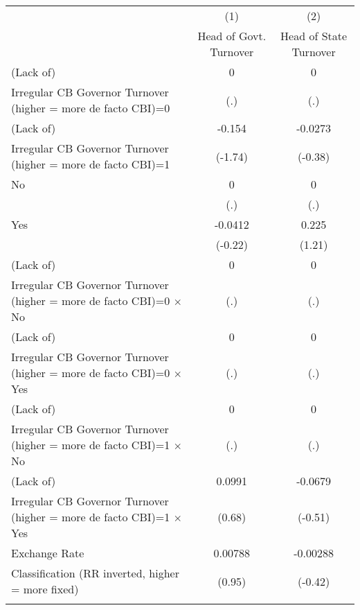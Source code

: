 {
\def\sym#1{\ifmmode^{#1}\else\(^{#1}\)\fi}
\begin{tabular}{l*{2}{c}}
\toprule
                &\multicolumn{1}{c}{(1)}&\multicolumn{1}{c}{(2)}\\
                &\multicolumn{1}{c}{Head of Govt. Turnover}&\multicolumn{1}{c}{Head of State Turnover}\\
\midrule
(Lack of)       &        0         &        0         \\
Irregular CB Governor Turnover (higher = more de facto CBI)=0&      (.)         &      (.)         \\
\addlinespace
(Lack of)       &   -0.154         &  -0.0273         \\
Irregular CB Governor Turnover (higher = more de facto CBI)=1&  (-1.74)         &  (-0.38)         \\
\addlinespace
No              &        0         &        0         \\
                &      (.)         &      (.)         \\
\addlinespace
Yes             &  -0.0412         &    0.225         \\
                &  (-0.22)         &   (1.21)         \\
\addlinespace
(Lack of)       &        0         &        0         \\
Irregular CB Governor Turnover (higher = more de facto CBI)=0 $\times$ No&      (.)         &      (.)         \\
\addlinespace
(Lack of)       &        0         &        0         \\
Irregular CB Governor Turnover (higher = more de facto CBI)=0 $\times$ Yes&      (.)         &      (.)         \\
\addlinespace
(Lack of)       &        0         &        0         \\
Irregular CB Governor Turnover (higher = more de facto CBI)=1 $\times$ No&      (.)         &      (.)         \\
\addlinespace
(Lack of)       &   0.0991         &  -0.0679         \\
Irregular CB Governor Turnover (higher = more de facto CBI)=1 $\times$ Yes&   (0.68)         &  (-0.51)         \\
\addlinespace
Exchange Rate   &  0.00788         & -0.00288         \\
Classification (RR inverted, higher = more fixed)&   (0.95)         &  (-0.42)         \\
\addlinespace

\end{tabular}}
